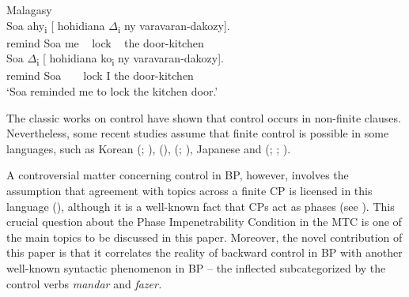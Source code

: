 \documentclass[output=paper]{langsci/langscibook}
\begin{document}
\ea%
    Malagasy \citep[755]{Potsdam2009}\label{ex:moreno:4}\\
    \ea
     Soa  ahy\textsubscript{i} [ hohidiana ${\Delta}$\textsubscript{i}   ny varavaran-dakozy].\\
         remind                 Soa   me   ~ lock ~ the door-kitchen\\
    \ex
     Soa  ${\Delta}$\textsubscript{i}        [ hohidiana ko\textsubscript{i}   ny varavaran-dakozy].\\
         remind                    Soa    ~ ~ lock          I      the door-kitchen\\
    \glt ‘Soa reminded me to lock the kitchen door.’
    \z
\z

\noindent The classic works on control have shown that control occurs in non-finite clauses. Nevertheless, some recent studies assume that finite control is possible in some languages, such as Korean (\citealt{Yang1985}; \citealt{Borer1989}),  (\citealt{Suñer1988}),  (\citealt{Terzi1992,Modesto2000a,Modesto2000b}; \citealt{Alexiadou2010,Alexiadou2011}), Japanese \citep{Uchibori2000} and (\citealt{Farrell1995}; \citealt{Rodrigues2004}; \citealt{Boeckx2006}).

A controversial matter concerning control in BP, however, involves the assumption that agreement with topics across a finite CP is licensed in this language (\citealt{Martins2005}), although it is a well-known fact that CPs act as phases (see \citealt{Chomsky2000}). This crucial question about the Phase Impenetrability Condition in the MTC is one of the main topics to be discussed in this paper. Moreover, the novel contribution of this paper is that it correlates the reality of backward control in BP with another well-known syntactic phenomenon in BP – the inflected  subcategorized by the control verbs \textit{mandar} and \textit{fazer.}

\end{document}

